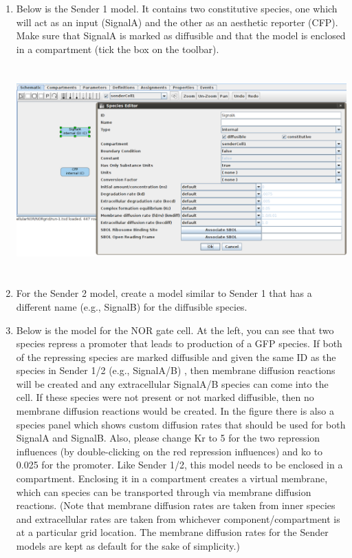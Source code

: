 \documentclass[titlepage,11pt]{article}
\begin{document}
\begin{enumerate}

\item Below is the Sender 1 model.  It contains two constitutive species, one which will act as an input (SignalA) and the other as an aesthetic reporter (CFP).  Make sure that SignalA is marked as diffusible and that the model is enclosed in a compartment (tick the box on the toolbar).

\includegraphics[height=80mm]{screenshots/sender1}

\item For the Sender 2 model, create a model similar to Sender 1 that has a different name (e.g., SignalB) for the diffusible species.

\item Below is the model for the NOR gate cell.  At the left, you can see that two species repress a promoter that leads to production of a GFP species.  If both of the repressing species are marked diffusible and given the same ID as the species in Sender 1/2 (e.g., SignalA/B) , then membrane diffusion reactions will be created and any extracellular SignalA/B species can come into the cell.  If these species were not present or not marked diffusible, then no membrane diffusion reactions would be created.  In the figure there is also a species panel which shows custom diffusion rates that should be used for both SignalA and SignalB.  Also, please change Kr to 5 for the two repression influences (by double-clicking on the red repression influences) and ko to 0.025 for the promoter.  Like Sender 1/2, this model needs to be enclosed in a compartment.  Enclosing it in a compartment creates a virtual membrane, which can species can be transported through via membrane diffusion reactions.  (Note that membrane diffusion rates are taken from inner species and extracellular rates are taken from whichever component/compartment is at a particular grid location.  The membrane diffusion rates for the Sender models are kept as default for the sake of simplicity.)


\end{enumerate}
\end{document}
